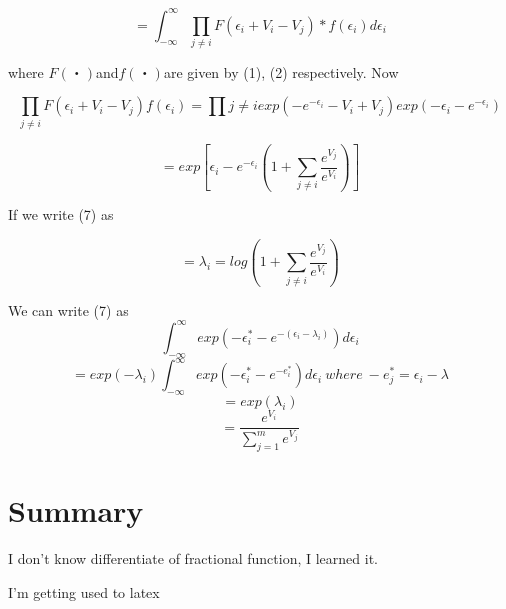 \documentclass[dvipdfmx]{jsarticle}
\begin{document}
 \begin{equation}
   = \int _{-\infty}^\infty\prod_{j\neq i} F(\epsilon_i + V_i - V_j)*f(\epsilon_i)d\epsilon_i
 \end{equation}

 where $F(・)$and$f(・)$are given by (1), (2) respectively. Now

 \begin{equation}
 \prod_{j\neq i}F(\epsilon_i + V_i - V_j)f(\epsilon_i) = \prod{j \neq i}exp(-e^{-\epsilon_i} - V_i + V_j)exp(-\epsilon_i - e^{-\epsilon_i})
\end{equation}

\begin{equation}
  = exp[\epsilon_i - e^{-\epsilon_i}(1 + \sum_{j \neq i}\frac{e^{V_j}}{e^{V_i}})]
 \end{equation}


 If we write (7) as

 \begin{equation}
  = \lambda_i = log(1 + \sum_{j \neq i}\frac{e^{V_j}}{e^{V_i}})
 \end{equation}

 We can write (7) as
 \begin{equation}
  \int _{-\infty}^\infty exp(-\epsilon^*_i-e^{-(\epsilon_i - \lambda_i)})d\epsilon_i
 \end{equation}
 \begin{equation}
  = exp(-\lambda_i)\int_{-\infty}^{\infty}exp(-\epsilon^*_i-e^{-e^*_i})d\epsilon_i \  where \  -e^*_j =  \epsilon_i - \lambda
 \end{equation}
 \begin{equation}
  = exp(\lambda_i)
 \end{equation}
 \begin{equation}
  = \frac{e^{V_i}}{\sum_{j = 1}^m e^{V_j}}
 \end{equation}
\section{Summary}

I don't know differentiate of fractional function, I learned it.

I'm getting used to latex
\end{document}
